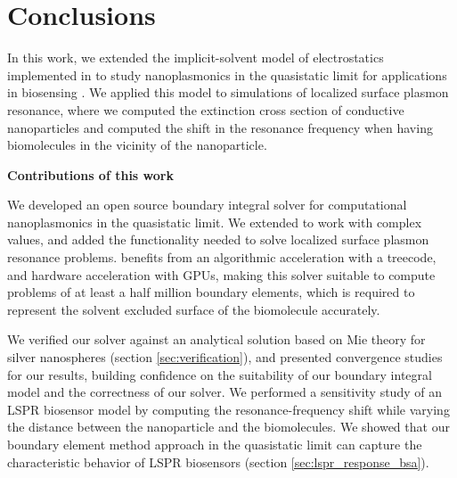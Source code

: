 \chapter{Conclusions}

In this work, we extended the implicit-solvent model of electrostatics implemented in \pygbe \cite{CooperClementiBarba2015}
to study nanoplasmonics in the quasistatic limit for applications in biosensing \cite{ClementiETal2017, ClementiETal2019}.
We applied this model to simulations of localized surface plasmon resonance, where we computed the extinction cross section of 
conductive nanoparticles and computed the shift in the resonance frequency when having biomolecules in the vicinity of the 
nanoparticle.

\textbf{Contributions of this work}

We developed an open source boundary integral solver for computational nanoplasmonics in the quasistatic limit. We extended \pygbe to work 
with complex values, and added the functionality needed to solve localized surface plasmon resonance problems. \pygbe 
benefits from an algorithmic acceleration with a treecode, and hardware acceleration with GPUs, making this solver 
suitable to compute problems of at least a half million boundary elements, which is required to represent the solvent excluded 
surface of the biomolecule accurately.

We verified our solver against an analytical solution based on Mie theory for silver nanospheres (section \ref{sec:verification}), and 
presented convergence studies for our results, building confidence on the suitability of our boundary integral model and the  
correctness of our solver. We performed a sensitivity study of an LSPR biosensor model by computing the resonance-frequency shift
while varying the distance between the nanoparticle and the biomolecules. We showed that our boundary element method approach in
the quasistatic limit can capture the characteristic behavior of LSPR biosensors (section \ref{sec:lspr_response_bsa}).


